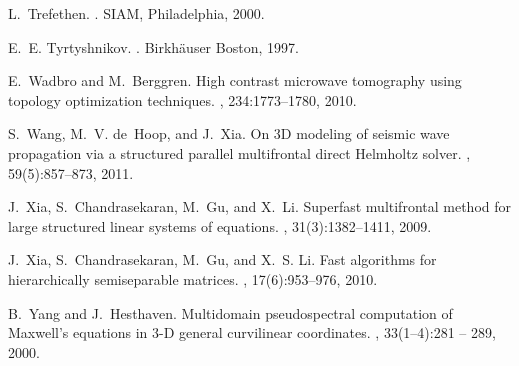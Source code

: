 \documentclass[11pt,final]{amsart}
\theoremstyle{definition}
\numberwithin{remark}{section}
\numberwithin{definition}{section}
\numberwithin{pro}{section}
\begin{document}
\begin{thebibliography}{}
L.~Trefethen.
.
\newblock SIAM, Philadelphia, 2000.

E.~E. Tyrtyshnikov.
.
\newblock Birkh\"auser Boston, 1997.

E.~Wadbro and M.~Berggren.
\newblock High contrast microwave tomography using topology optimization
  techniques.
, 234:1773--1780, 2010.

S.~Wang, M.~V. de~Hoop, and J.~Xia.
\newblock On {3D} modeling of seismic wave propagation via a structured
  parallel multifrontal direct {H}elmholtz solver.
, 59(5):857--873, 2011.

J.~Xia, S.~Chandrasekaran, M.~Gu, and X.~Li.
\newblock Superfast multifrontal method for large structured linear systems of
  equations.
, 31(3):1382--1411, 2009.

J.~Xia, S.~Chandrasekaran, M.~Gu, and X.~S. Li.
\newblock Fast algorithms for hierarchically semiseparable matrices.
, 17(6):953--976, 2010.

B.~Yang and J.~Hesthaven.
\newblock Multidomain pseudospectral computation of {M}axwell's equations in
  {3-D} general curvilinear coordinates.
, 33(1--4):281 -- 289, 2000.

\end{thebibliography}
\end{document}
